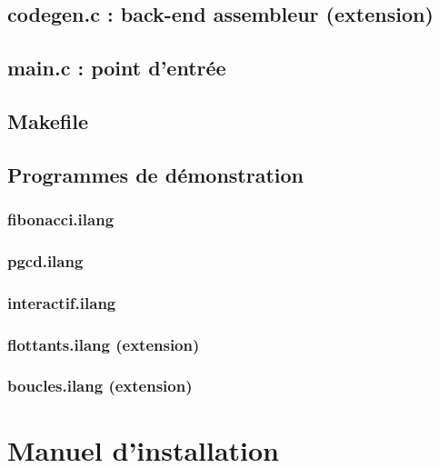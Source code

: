 \section{codegen.c : back-end assembleur (extension)}


\section{main.c : point d'entrée}


\section{Makefile}


\section{Programmes de démonstration}

\subsection{fibonacci.ilang}


\subsection{pgcd.ilang}


\subsection{interactif.ilang}


\subsection{flottants.ilang (extension)}


\subsection{boucles.ilang (extension)}


\chapter{Manuel d'installation}
\label{annexe:install}

